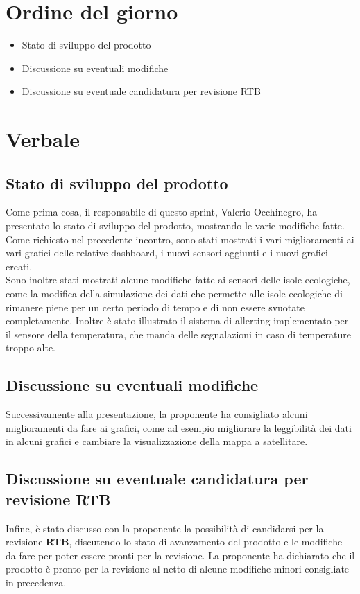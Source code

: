 \documentclass[italian,12pt]{article}
\begin{document}
\section{Ordine del giorno}
\begin{itemize}
	\item Stato di sviluppo del prodotto
	\item Discussione su eventuali modifiche
	\item Discussione su eventuale candidatura per revisione RTB
\end{itemize}

\newpage

\section{Verbale}

\subsection{Stato di sviluppo del prodotto}
Come prima cosa, il responsabile di questo sprint, Valerio Occhinegro, ha presentato lo stato di sviluppo del prodotto,
mostrando le varie modifiche fatte. Come richiesto nel precedente incontro, sono stati mostrati i vari miglioramenti
ai vari grafici delle relative dashboard, i nuovi sensori aggiunti e i nuovi grafici creati.\\
Sono inoltre stati mostrati alcune modifiche fatte ai sensori delle isole ecologiche, come la modifica della
simulazione dei dati che permette alle isole ecologiche di rimanere piene per un certo periodo di tempo e di non essere
svuotate completamente. Inoltre è stato illustrato il sistema di allerting implementato per il sensore della
temperatura, che manda delle segnalazioni in caso di temperature troppo alte.\\

\subsection{Discussione su eventuali modifiche}
Successivamente alla presentazione, la proponente ha consigliato alcuni miglioramenti da fare ai grafici, come ad
esempio migliorare la leggibilità dei dati in alcuni grafici e cambiare la visualizzazione della mappa a satellitare.\\

\subsection{Discussione su eventuale candidatura per revisione RTB}
Infine, è stato discusso con la proponente la possibilità di candidarsi per la revisione \textbf{RTB}, discutendo lo
stato di avanzamento del prodotto e le modifiche da fare per poter essere pronti per la revisione. La proponente ha
dichiarato che il prodotto è pronto per la revisione al netto di alcune modifiche minori consigliate in precedenza.\\
\end{document}
